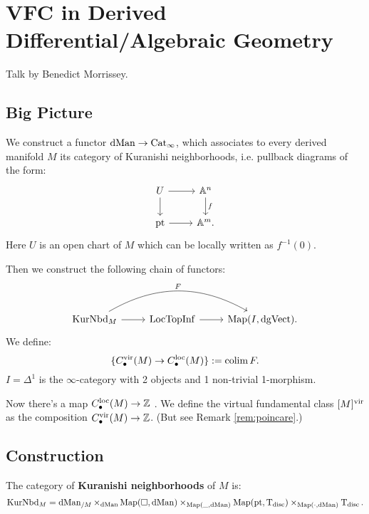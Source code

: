 \chapter{VFC in Derived Differential/Algebraic Geometry}
\label{ch:infinity}

Talk by Benedict Morrissey.

\section{Big Picture}
We construct a functor $\operatorname{dMan} \to \mathrm{Cat}_{\infty}$, which associates to every derived manifold $M$ its category of Kuranishi
neighborhoods, i.e. pullback diagrams of the form:
\[
\begin{tikzcd}
U \arrow{r}\arrow{d} & \bbA^n \arrow{d}{f} \\
\pt \arrow{r} & \bbA^m .
\end{tikzcd}
\]
Here $U$ is an open chart of $M$ which can be locally written as $f^{-1}(0)$.

Then we construct the following chain of functors:
\[
\begin{tikzcd}
\KurNbd_M\arrow{r}\arrow[bend left]{rr}{F} & \LocTopInf\arrow{r} & \Map ( I, \dgVect ) .
\end{tikzcd}
\]
We define:
\[	\{C^{\operatorname{vir}}_{\bullet}(M) \to C^{\operatorname{loc}}_{\bullet}(M)\} := \operatorname*{colim} F .\]
$I = \Delta^1$ is the $\infty$-category with 2 objects and 1 non-trivial 1-morphism.

Now there's a map $C^{\operatorname{loc}}_{\bullet}(M) \to \mathbb Z$ . We define the virtual
fundamental class $[M]^{\operatorname{vir}}$ as the composition $C^{\operatorname{vir}}_{\bullet}(M)\to \mathbb Z$. (But see Remark \ref{rem:poincare}.)



\section{Construction}
\begin{defin}
The category of \textbf{Kuranishi neighborhoods} of $M$ is:
\[	\operatorname{KurNbd}_M = \operatorname{dMan}_{/M} \times_{\operatorname{dMan}} \operatorname{Map}(\Box, \operatorname{dMan}) \times_{\operatorname{Map}(\_, \operatorname{dMan})} \operatorname{Map}(\operatorname{pt}, \operatorname{T_{\text{disc}}}) 
\times_{\operatorname{Map}(\cdot, \operatorname{dMan})} \operatorname{T_{\text{disc}}} .	\]
\end{defin}

